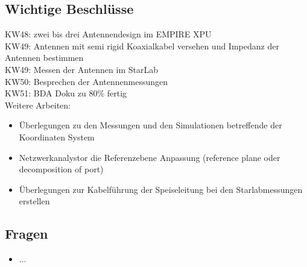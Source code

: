 \documentclass[10pt,a4paper]{article}
\begin{document}
\subsection*{Wichtige Beschlüsse}
KW48: zwei bis drei Antennendesign im EMPIRE XPU \\
KW49: Antennen mit semi rigid Koaxialkabel versehen und Impedanz der Antennen bestimmen\\
KW49: Messen der Antennen im StarLab\\
KW50: Besprechen der Antennenmessungen\\
KW51: BDA Doku zu 80\% fertig\\


Weitere Arbeiten:
\begin{itemize}
\item Überlegungen zu den Messungen und den Simulationen betreffende der Koordinaten System
	\item Netzwerkanalystor die Referenzebene Anpassung (reference plane oder decomposition of port)
	\item Überlegungen zur Kabelführung der Speiseleitung bei den Starlabmessungen erstellen
\end{itemize}
\subsection*{Fragen}
\begin{itemize}
	\item ...
\end{itemize}
\end{document}
